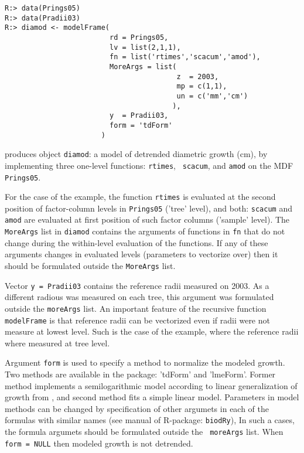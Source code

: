 \documentclass[review,authoryear]{elsarticle}
\begin{document}
\begin{verbatim}
R:> data(Prings05)
R:> data(Pradii03)
R:> diamod <- modelFrame(
                         rd = Prings05,
                         lv = list(2,1,1),
                         fn = list('rtimes','scacum','amod'),
                         MoreArgs = list(
                                         z  = 2003,           
                                         mp = c(1,1),         
                                         un = c('mm','cm')    
                                        ),
                         y  = Pradii03,
                         form = 'tdForm'              
                       )
\end{verbatim}

produces object {\tt diamod}: a model of detrended diametric growth
(cm), by implementing three one-level functions: {\tt rtimes}, {\tt
  scacum}, and {\tt amod} on the MDF {\tt Prings05}. 


For the case of the example, the function
{\tt rtimes} is evaluated at the second position of factor-column
levels in {\tt Prings05} ('tree' level), and both: {\tt scacum} and
{\tt amod} are evaluated at first position of such factor columns
('sample' level). The {\tt MoreArgs} list in {\tt diamod} contains the
arguments of functions in {\tt fn} that do not change during the
within-level evaluation of the functions. If any of these arguments
changes in evaluated levels (parameters to vectorize over) then it
should be formulated outside the {\tt MoreArgs} list.

Vector {\tt y = Pradii03} contains the reference radii measured on
2003. As a different radious was measured on each tree, this argument
was formulated outside the {\tt moreArgs} list. An important feature
of the recursive function {\tt modelFrame} is that reference radii can
be vectorized even if radii were not measure at lowest level. Such is
the case of the example, where the reference radii where measured at
tree level.

Argument {\tt form} is used to specify a method to normalize the
modeled growth. Two methods are available in the package: 'tdForm' and
'lmeForm'. Former method implements a semilogarithmic model according
to linear generalization of growth from \cite{Zeide1993}, and second
method fits a simple linear model. Parameters in model methods can be
changed by specification of other argumets in each of the formulas
with similar names (see manual of R-package: {\tt biodRy}), In such a
cases, the formula argumets should be formulated outside the {\tt
  moreArgs} list.  When {\tt form = NULL} then modeled growth is not
detrended.
\end{document}
